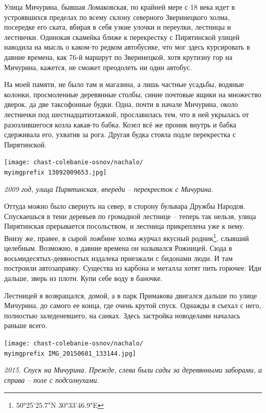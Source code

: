 Улица Мичурина, бывшая Ломаковская, по крайней мере с 18 века
идет в устроявшихся пределах по всему склону северного Зверинецкого холма, посередке его ската, вбирая в себя узкие улочки и переулки, лестницы и лестнички. Одинокая скамейка ближе к перекрестку с Пирятинской улицей наводила на мысль о каком-то редком автобусике, что мог здесь курсировать в давние времена, как 76-й маршрут по Зверинецкой, хотя крутизну гор на Мичурина, кажется, не сможет преодолеть ни один автобус.

На моей памяти, не было там и магазина, а лишь частные усадьбы, водяные колонки, просмоленные деревянные столбы, синие почтовые ящики на множество дверок, да две таксофонные будки. Одна, почти в начале Мичурина, около лестнички под шестнадцатиэтажкой, прославилась тем, что в ней укрылась от разозлившегося козла какая-то бабка. Козел всё же проник внутрь и бабка сдерживала его, ухватив за рога. Другая будка стояла подле перекрестка с Пирятинской. 

\begin{center}
\texttt{[image: chast-colebanie-osnov/nachalo/\\myimgprefix 13092009653.jpg]}

\textit{2009 год, улица Пирятинская, впереди – перекресток с Мичурина.} 
\end{center}

Оттуда можно было свернуть на север, в сторону бульвара Дружбы Народов. Спускаешься в тени деревьев по громадной лестнице – теперь так нельзя, улица Пирятинская прерывается посольством, и лестница прикреплена уже к нему. Внизу же, правее, в сырой ложбине холма журчал вкусный родник\footnote{50°25'25.7"N 30°33'46.9"E}, слывший целебным. Возможно, в давние времена он назывался Рожницей. Сюда в восьмидесятых-девяностых издалека приезжали с бидонами люди. И там построили автозаправку. Существа из карбона и металла хотят пить горючее. Иди дальше, зверь из плоти. Купи себе воду в баночке.

Лестницей я возвращался, домой, а в парк Примакова двигался дальше по улице Мичурина, до самого ее конца, где очень крутой спуск. Однажды я съехал с него, полностью заледеневшего, на санках. Здесь застройка новоделами началась раньше всего.

\begin{center}
\texttt{[image: chast-colebanie-osnov/nachalo/\\myimgprefix IMG\_20150601\_133144.jpg]}

\textit{2015. Спуск на Мичурина. Прежде, слева были сады за деревянными заборами, а справа – поле с подсолнухами.} 
\end{center}

